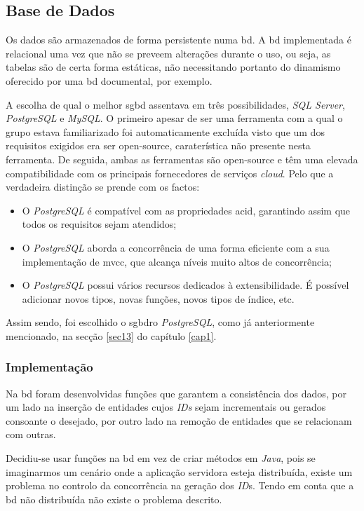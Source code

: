 %
%
\subsection{Base de Dados}\label{subsec452}

Os dados são armazenados de forma persistente numa \acrfull{bd}. A \acrshort{bd} implementada é relacional uma vez que não se preveem alterações durante o uso, ou seja, as tabelas são de certa forma estáticas, não necessitando portanto do dinamismo oferecido por uma \acrshort{bd} documental, por exemplo. 

 A escolha de qual o melhor \acrfull{sgbd} assentava em três possibilidades, \textit{SQL Server}, \textit{PostgreSQL} e \textit{MySQL}. O primeiro apesar de ser uma ferramenta com a qual o grupo estava familiarizado foi automaticamente excluída visto que um dos requisitos exigidos era ser \gls{open-source}, caraterística não presente nesta ferramenta. De seguida, ambas as ferramentas são \gls{open-source} e têm uma elevada compatibilidade com os principais fornecedores de serviços \textit{cloud}. Pelo que a verdadeira distinção se prende com os factos:
 	\begin{itemize}
 		\item O \textit{PostgreSQL} é compatível com as propriedades \acrfull{acid}, garantindo assim que todos os requisitos sejam atendidos;
 		\item O \textit{PostgreSQL} aborda a concorrência de uma forma eficiente com a sua implementação de \acrfull{mvcc}, que alcança níveis muito altos de concorrência;
 		\item O \textit{PostgreSQL} possui vários recursos dedicados à extensibilidade. É possível adicionar novos tipos, novas funções, novos tipos de índice, etc.
	\end{itemize}
 Assim sendo, foi escolhido o \acrfull{sgbdro} \textit{PostgreSQL}, como já anteriormente mencionado, na secção \ref{sec13} do capítulo \ref{cap1}.
 
 \subsubsection{Implementação}\label{subsubsec4521}
 
Na \acrshort{bd} foram desenvolvidas funções que garantem a consistência dos dados, por um lado na inserção de entidades cujos \textit{IDs} sejam incrementais ou gerados consoante o desejado, por outro lado na remoção  de entidades que se relacionam com outras.

Decidiu-se usar funções na \acrshort{bd} em vez de criar métodos em \textit{Java}, pois se imaginarmos um cenário onde a aplicação servidora esteja distribuída, existe um problema no controlo da concorrência na geração dos \textit{ID}s. Tendo em conta que a \acrshort{bd} não distribuída não existe o problema descrito.
